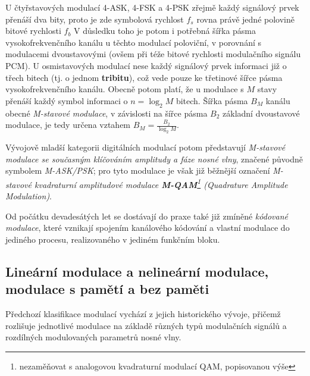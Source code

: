       U čtyřstavových modulací 4-ASK, 4-FSK a 4-PSK zřejmě každý signálový prvek přenáší dva bity, proto je 
      zde symbolová rychlost \(f_s\) rovna právě jedné polovině bitové rychlosti \(f_b\) V důsledku toho je 
      potom i potřebná šířka pásma vysokofrekvenčního kanálu u těchto modulací poloviční, v porovnání s 
      modulacemi dvoustavovými (ovšem při téže bitové rychlosti modulačního signálu PCM). U osmistavových 
      modulací nese každý signálový prvek informaci již o třech bitech (tj. o jednom \textbf{tribitu}), což 
      vede pouze ke třetinové šířce pásma vysokofrekvenčního kanálu. Obecně potom platí, že u modulace s 
      \(M\) 
      stavy přenáší každý symbol informaci o \(n = \log_2 M\) bitech. Šířka pásma \(B_M\) kanálu obecné 
      \emph{M-stavové modulace}, v závislosti na šířce pásma \(B_2\) základní dvoustavové modulace, je tedy 
      určena vztahem \(B_M = \frac{B_2}{\log_2 M}.\) 
      
      Vývojově mladší kategorii digitálních modulací potom představují \emph{M-stavové modulace se současným 
      klíčováním amplitudy a fáze nosné vlny}, značené původně symbolem \emph{M-ASK/PSK}; pro tyto modulace 
      je však již běžnější označení \emph{M-stavové kvadraturní amplitudové modulace 
      \textbf{M-QAM}\footnote{nezaměňovat s analogovou kvadraturní modulací QAM, popisovanou výše} 
      (Quadrature Amplitude Modulation)}.
      
      Od počátku devadesátých let se dostávají do praxe také již zmíněné \emph{kódované modulace}, které 
      vznikají spojením kanálového kódování a vlastní modulace do jediného procesu, realizovaného v jediném 
      funkčním bloku. 
    
    \subsection{Lineární modulace a nelineární modulace, modulace s pamětí a bez paměti}
      Předchozí klasifikace modulací vychází z jejich historického vývoje, přičemž rozlišuje jednotlivé 
      modulace na základě různých typů modulačních signálů a rozdílných modulovaných parametrů nosné vlny.
      
